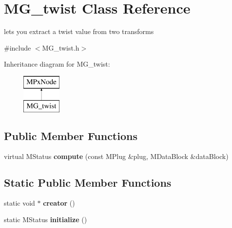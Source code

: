 \hypertarget{class_m_g__twist}{\section{M\-G\-\_\-twist Class Reference}
\label{class_m_g__twist}
}


lets you extract a twist value from two transforms  




{\ttfamily \#include $<$M\-G\-\_\-twist.\-h$>$}

Inheritance diagram for M\-G\-\_\-twist\-:\begin{figure}[H]
\begin{center}
\leavevmode
\includegraphics[height=2.000000cm]{class_m_g__twist}
\end{center}
\end{figure}
\subsection*{Public Member Functions}
\begin{DoxyCompactItemize}
\item 
\hypertarget{class_m_g__twist_ac9b4a271cdca26dc4ca7fb6eb56e390c}{virtual M\-Status {\bfseries compute} (const M\-Plug \&plug, M\-Data\-Block \&data\-Block)}\label{class_m_g__twist_ac9b4a271cdca26dc4ca7fb6eb56e390c}

\end{DoxyCompactItemize}
\subsection*{Static Public Member Functions}
\begin{DoxyCompactItemize}
\item 
\hypertarget{class_m_g__twist_a028726ad6a2ddbf567019014fd234b28}{static void $\ast$ {\bfseries creator} ()}\label{class_m_g__twist_a028726ad6a2ddbf567019014fd234b28}

\item 
\hypertarget{class_m_g__twist_a7d33df78fd5b162dc731a2668455f64c}{static M\-Status {\bfseries initialize} ()}\label{class_m_g__twist_a7d33df78fd5b162dc731a2668455f64c}

\end{DoxyCompactItemize}
